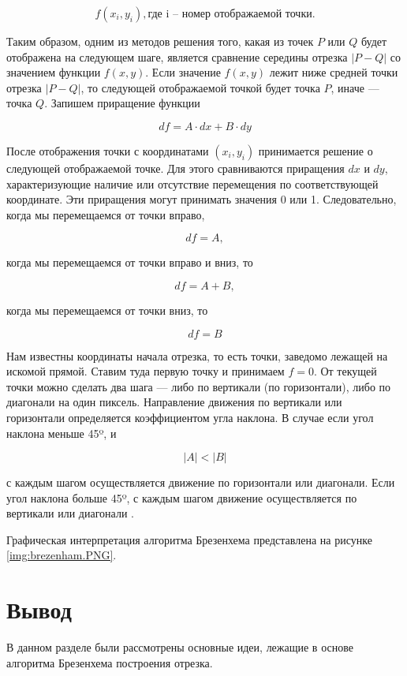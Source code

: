 \begin{equation}
	f(x_{i},y_{i}), \text{где i – номер отображаемой точки.}
\end{equation}

Таким образом, одним из методов решения того, какая из точек $P$ или $Q$ будет отображена на следующем шаге, является сравнение середины отрезка $|P-Q|$ со значением функции $f(x,y)$. Если значение $f(x,y)$ лежит ниже средней точки отрезка $|P-Q|$, то следующей отображаемой точкой будет точка $P$, иначе — точка $Q$.
Запишем приращение функции

\begin{equation}
	df=A \cdot dx+B \cdot dy
\end{equation}

После отображения точки с координатами $(x_{i},y_{i})$ принимается решение о следующей отображаемой точке. Для этого сравниваются приращения $dx$ и $dy$, характеризующие наличие или отсутствие перемещения по соответствующей координате. Эти приращения могут принимать значения 0 или 1. Следовательно, когда мы перемещаемся от точки вправо,

\begin{equation}
	df=A,
\end{equation}

когда мы перемещаемся от точки вправо и вниз, то

\begin{equation}
	df=A + B,
\end{equation}

когда мы перемещаемся от точки вниз, то

\begin{equation}
	df=B
\end{equation}

Нам известны координаты начала отрезка, то есть точки, заведомо лежащей на искомой прямой. Ставим туда первую точку и принимаем $f = 0$. От текущей точки можно сделать два шага — либо по вертикали (по горизонтали), либо по диагонали на один пиксель.
Направление движения по вертикали или горизонтали определяется коэффициентом угла наклона. В случае если угол наклона меньше 45º, и

\begin{equation}
|A|<|B|
\end{equation}

с каждым шагом осуществляется движение по горизонтали или диагонали.
Если угол наклона больше 45º, с каждым шагом движение осуществляется по вертикали или диагонали \cite{brez_alg}.

Графическая интерпретация алгоритма Брезенхема представлена на рисунке \ref{img:brezenham.PNG}.

\section*{Вывод}
В данном разделе были рассмотрены основные идеи, лежащие в основе алгоритма Брезенхема построения отрезка.